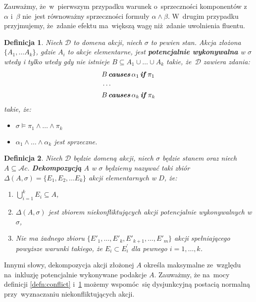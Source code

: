 \documentclass[11pt,a4paper]{article}
\newtheorem{defn}{Definicja}
\DeclareMathOperator{\Causes}{\textbf{\textit{causes}}}
\DeclareMathOperator{\If}{\textbf{\textit{if}}}
\begin{document}
Zauważmy, że~w~pierwszym przypadku warunek o~sprzeczności komponentów z~$\alpha$ i~$\beta$ nie~jest równoważny sprzeczności formuły $\alpha \land \beta$.
W~drugim przypadku przyjmujemy, że~zdanie efektu ma~większą wagę niż~zdanie uwolnienia fluentu. %

\begin{defn}
    \label{defn:potentially-executable}
    Niech $\mathcal{D}$ to domena akcji, niech $\sigma$ to pewien stan. Akcja złożona $\{ A_1, \dots A_k \}$, gdzie $A_i$ to akcje elementarne, jest \textbf{potencjalnie wykonywalna} w $\sigma$ wtedy i tylko wtedy gdy nie istnieje $B \subseteq A_1 \cup \dots \cup A_k$ takie, że~$\mathcal{D}$ zawiera zdania:
    \begin{align*}
        & B \Causes \alpha_1 \If \pi_1 \\
        & \cdots \\
        & B \Causes \alpha_k \If \pi_k
    \end{align*}
    takie, że:
    \begin{itemize}
        \item $\sigma \models \pi_1 \land \dots \land \pi_k$
        \item $\alpha_1 \land \dots \land \alpha_k$ jest sprzeczne.
    \end{itemize}
\end{defn}

\begin{defn}
    Niech $\mathcal{D}$ będzie domeną akcji, niech $\sigma$ będzie stanem oraz niech $A \subseteq \mathcal{A}c$.
    \textbf{Dekompozycją} $A$ w $\sigma$ będziemy nazywać taki zbiór $\Delta(A, \sigma) = \{ E_1, E_2, \dots E_k \}$ akcji elementarnych w $D$, że:
    \begin{enumerate}
        \item $\bigcup_{i = 1}^{k} E_i \subseteq A$,
        \item $\Delta(A, \sigma)$ jest zbiorem niekonfliktujących akcji potencjalnie wykonywalnych w  $\sigma$,
        \item Nie ma żadnego zbioru $\{ E'_1, \dots, E'_k, E'_{k+1}, \dots, E'_m \}$ akcji spełniającego powyższe warunki takiego, że $E_i \subset E_i^\prime$ dla pewnego $i = 1, \dots, k$.
    \end{enumerate}
\end{defn}

Innymi słowy, dekompozycja akcji złożonej $A$ określa maksymalne ze~względu na~inkluzję potencjalnie wykonywane podakcje $A$.
Zauważmy, że na~mocy definicji \ref{defn:conflict} i~\ref{defn:potentially-executable} możemy wspomóc~się dysjunkcyjną postacią normalną przy~wyznaczaniu niekonfliktujących akcji.
    
\end{document}
